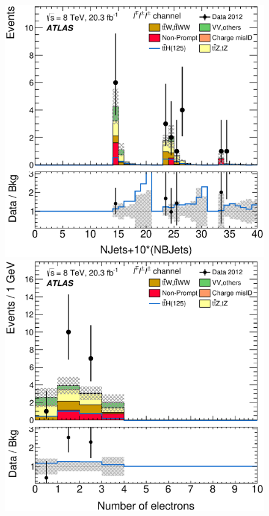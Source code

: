 \begin{figure}[!htbp]
\begin{minipage}[h]{0.4\textwidth}
  \end{minipage}\hfill
  \begin{minipage}[h]{0.4\textwidth}
    \centering \includegraphics[width=\textwidth]{figs/results/results_new/3lep_SR_NJetCombined}
  \end{minipage}\hfill
  \begin{minipage}[h]{0.4\textwidth}
    \centering \includegraphics[width=\textwidth]{figs/results/results_new/3lep_SR_NElec}

\end{minipage}
\end{figure}
